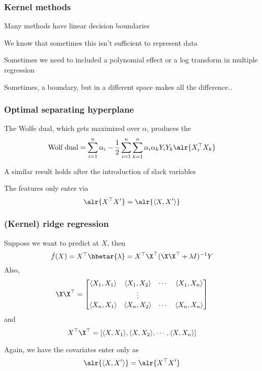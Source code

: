 \documentclass[12pt]{beamer}
\begin{document}
\title{}
\subtitle{\classTitle}
\date{}



\begin{frame}
\maketitle
%
\organization
%
\end{frame}


\begin{frame}
\frametitle{Kernel methods}
Many methods have linear decision boundaries

\vsp
We know that sometimes this isn't sufficient to represent data

\vvsp
{} Sometimes we need to included a polynomial effect or a log transform
in multiple regression

\vvvsp
Sometimes, a  boundary, but in a different space makes all the difference..
\vfill
\end{frame}


\begin{frame}
\frametitle{Optimal separating hyperplane}
The Wolfe dual, which gets maximized over $\alpha$, produces the 
\[
\textrm{Wolf dual}  = 	\sum_{i=1}^n\alpha_i - \frac{1}{2}\sum_{i=1}^n\sum_{k=1}^n\alpha_i\alpha_kY_iY_k\alr{X_i^{\top}X_k}
\]

\vsp
A similar result holds after the introduction of slack variables


\vsp
{} The features only enter  via
\[
\alr{X^{\top}X'} = \alr{\langle X,X' \rangle}
\]
\end{frame}

\begin{frame}
\frametitle{(Kernel) ridge regression}
Suppose we want to predict at $X$, then 
\[
\hat{f}(X) = X^{\top}\hbetar{\lambda} =  X^{\top}\X^{\top}( \X\X^{\top} + \lambda I)^{-1}Y
\]
Also,
\[
\X\X^{\top} = 
\begin{bmatrix}
\langle X_1, X_1 \rangle & \langle X_1, X_2 \rangle & \cdots & \langle X_1, X_n \rangle \\
& \vdots && \\
\langle X_n, X_1 \rangle & \langle X_n, X_2 \rangle & \cdots & \langle X_n, X_n \rangle
\end{bmatrix}
\]
and
\[
X^{\top}\X^{\top} = [\langle X, X_1 \rangle,  \langle X, X_2 \rangle, \cdots, \langle X, X_n \rangle]
\]

\vsp
Again, we have the covariates enter only as
\[
\alr{\langle X,X' \rangle} = \alr{X^{\top}X'}
\]
\end{frame}
\end{document}

